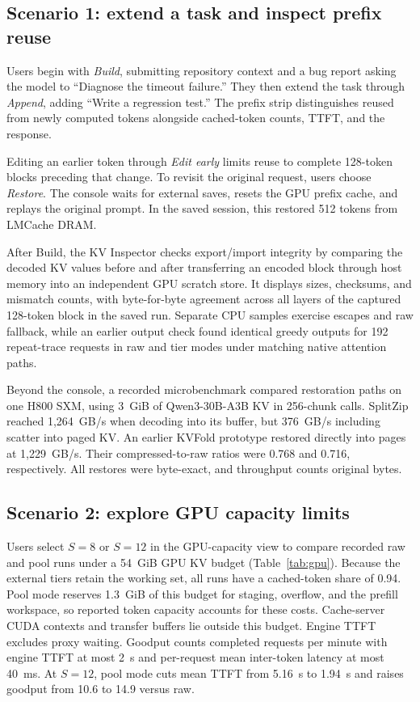 \documentclass[conference]{IEEEtran}
\begin{document}
\begin{samepage}
\subsection*{Scenario 1: extend a task and inspect prefix reuse}
Users begin with \emph{Build}, submitting repository context and a bug
report asking the model to ``Diagnose the timeout failure.'' They then
extend the task through \emph{Append}, adding ``Write a regression test.''
The prefix strip distinguishes reused from newly computed tokens alongside
cached-token counts, TTFT, and the response.\par
\end{samepage}

Editing an earlier token through \emph{Edit early} limits reuse to complete
128-token blocks preceding
that change. To revisit the original request, users choose \emph{Restore}.
The console waits for external saves, resets the GPU prefix cache, and
replays the original prompt. In the saved session, this restored 512 tokens
from LMCache DRAM.

After Build, the KV Inspector checks export/import integrity by comparing
the decoded KV values before and after transferring an encoded block
through host memory into an independent GPU scratch store. It displays sizes, checksums,
and mismatch counts, with byte-for-byte agreement across all layers of the
captured 128-token block in the saved run. Separate CPU samples exercise
escapes and raw fallback, while an earlier output check found identical
greedy outputs for 192 repeat-trace requests in raw and tier modes under
matching native attention paths.

Beyond the console, a recorded microbenchmark compared restoration paths on one H800 SXM,
using 3~GiB of Qwen3-30B-A3B KV in 256-chunk calls.
SplitZip reached 1,264~GB/s when
decoding into its buffer, but 376~GB/s including scatter into paged KV.
An earlier KVFold prototype restored directly into pages at 1,229~GB/s.
Their compressed-to-raw ratios were 0.768 and 0.716, respectively.
All restores were byte-exact, and throughput counts original bytes.

\subsection*{Scenario 2: explore GPU capacity limits}
Users select $S=8$ or $S=12$ in the GPU-capacity view to compare recorded
raw and pool runs under a 54~GiB GPU KV budget (Table~\ref{tab:gpu}).
Because the external tiers retain the working set, all runs have a
cached-token share of 0.94. Pool mode reserves 1.3~GiB of this budget
for staging, overflow, and the prefill workspace, so reported token
capacity accounts for these costs.
Cache-server CUDA contexts and transfer buffers lie outside this budget. Engine TTFT excludes proxy waiting. Goodput counts completed
requests per minute with engine TTFT at most 2~s and per-request mean
inter-token latency at most 40~ms. At $S=12$, pool mode cuts mean TTFT
from 5.16~s to 1.94~s and raises goodput from 10.6 to 14.9 versus raw.
\end{document}

